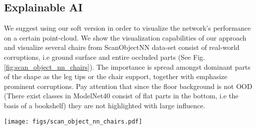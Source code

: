 \documentclass[10pt,twocolumn,letterpaper]{article}
\begin{document}
\subsection{Explainable AI}
We suggest using our soft version in order to visualize the network's performance on a certain point-cloud. We show the visualization capabilities of our approach and visualize several chairs from ScanObjectNN \cite{scanobjectnn} data-set consist of real-world corruptions, i.e ground surface and entire occluded parts (See Fig. \ref{fig:scan_object_nn_chairs}). The importance is spread amongst dominant parts of the shape as the leg tips or the chair support, together with emphasize prominent corruptions. Pay attention that since the floor background is not OOD (There exist classes in ModelNet40 consist of flat parts in the bottom, i.e the basis of a bookshelf) they are not highlighted with large influence.




\begin{figure*}[ptbh!]
  \centering
\texttt{[image: figs/scan\_object\_nn\_chairs.pdf]}
   \caption{{\bf Explainable AI using Critical Points ++ on chair examples from ScanObjectNN \cite{scanobjectnn}.} The importance is spread reasonably amongst the chairs dominant features (i.e the chair support and leg tips) even under severe degradations.}
   \label{fig:scan_object_nn_chairs}
\end{figure*}
\end{document}
